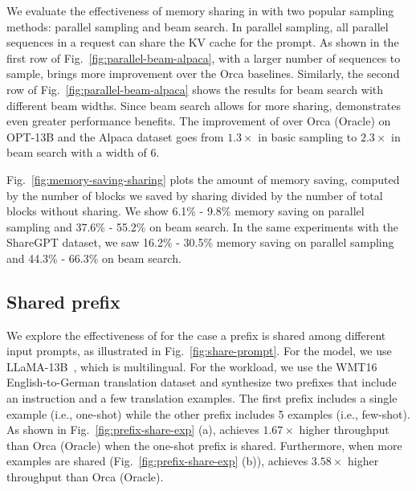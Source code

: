 We evaluate the effectiveness of memory sharing in \tech with two popular sampling methods: parallel sampling and beam search.
In parallel sampling, all parallel sequences in a request can share the KV cache for the prompt.
As shown in the first row of Fig.~\ref{fig:parallel-beam-alpaca}, with a larger number of sequences to sample, \sys brings more improvement over the Orca baselines.
Similarly, the second row of Fig.~\ref{fig:parallel-beam-alpaca} shows the results for beam search with different beam widths.
Since beam search allows for more sharing, \sys demonstrates even greater performance benefits.
The improvement of \sys over Orca (Oracle) on OPT-13B and the Alpaca dataset goes from $1.3 \times$ in basic sampling to $2.3 \times$ in beam search with a width of 6.

Fig.~\ref{fig:memory-saving-sharing} plots the amount of memory saving, computed by the number of blocks we saved by sharing divided by the number of total blocks without sharing. We show 6.1\% - 9.8\% memory saving on parallel sampling and 37.6\% - 55.2\% on beam search.
In the same experiments with the ShareGPT dataset, we saw 16.2\% - 30.5\% memory saving on parallel sampling and 44.3\% - 66.3\% on beam search.



\subsection{Shared prefix}

We explore the effectiveness of \sys for the case a prefix is shared among different input prompts, as illustrated in Fig.~\ref{fig:share-prompt}.
For the model, we use LLaMA-13B~\cite{touvron2023llama}, which is multilingual.
For the workload, we use the WMT16~\cite{bojar-EtAl:2016:WMT1} English-to-German translation dataset and synthesize two prefixes that include an instruction and a few translation examples.
The first prefix includes a single example (i.e., one-shot) while the other prefix includes 5 examples (i.e., few-shot).
As shown in Fig.~\ref{fig:prefix-share-exp} (a), \sys achieves $1.67 \times$ higher throughput than Orca (Oracle) when the one-shot prefix is shared.
Furthermore, when more examples are shared (Fig.~\ref{fig:prefix-share-exp} (b)), \sys achieves $3.58 \times$ higher throughput than Orca (Oracle).

